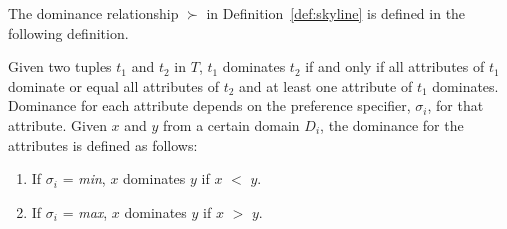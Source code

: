 The dominance relationship $\succ$ in Definition~\ref{def:skyline}
is defined in the following definition.

\begin{definition}\label{def:dom_rel}
Given two tuples $t_1$ and $t_2$ in $T$, $t_1$ dominates $t_2$ if
and only if all attributes of $t_1$ dominate or equal all
attributes of $t_2$ and at least one attribute of $t_1$ dominates.
Dominance for each attribute depends on the preference specifier,
$\sigma_i$, for that attribute. Given $x$ and $y$ from a certain
domain $D_i$, the dominance for the attributes is defined as
follows:

\begin{enumerate}
\item If $\sigma_i$ = \emph{min}, $x$ dominates $y$ if $x$ $<$
$y$. \item If $\sigma_i$ = \emph{max}, $x$ dominates $y$ if $x$
$>$ $y$.
\end{enumerate}
\end{definition}




%
%


